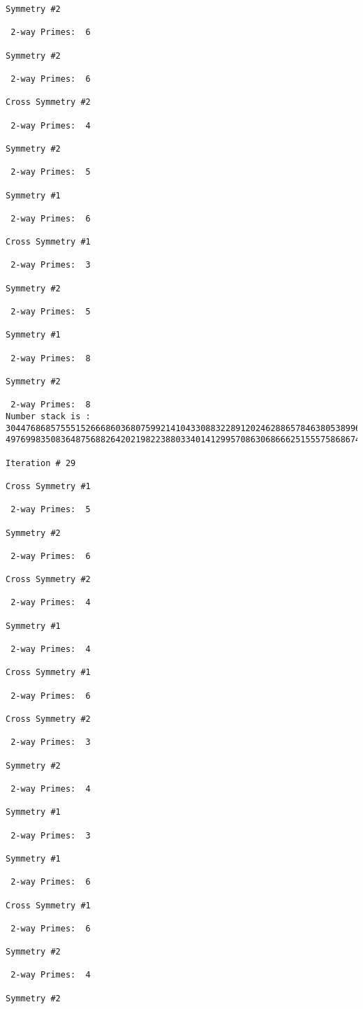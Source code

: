 {{{{\begin{verbatim}
Symmetry #2

 2-way Primes: 	6

Symmetry #2

 2-way Primes: 	6

Cross Symmetry #2

 2-way Primes: 	4

Symmetry #2

 2-way Primes: 	5

Symmetry #1

 2-way Primes: 	6

Cross Symmetry #1

 2-way Primes: 	3

Symmetry #2

 2-way Primes: 	5

Symmetry #1

 2-way Primes: 	8

Symmetry #2

 2-way Primes: 	8
Number stack is :
30447686857555152666860368075992141043308832289120246288657846380538996794608835958544046240163340857
49769983508364875688264202198223880334014129957086306866625155575868674403758043361042640445859538806

Iteration #	29

Cross Symmetry #1

 2-way Primes: 	5

Symmetry #2

 2-way Primes: 	6

Cross Symmetry #2

 2-way Primes: 	4

Symmetry #1

 2-way Primes: 	4

Cross Symmetry #1

 2-way Primes: 	6

Cross Symmetry #2

 2-way Primes: 	3

Symmetry #2

 2-way Primes: 	4

Symmetry #1

 2-way Primes: 	3

Symmetry #1

 2-way Primes: 	6

Cross Symmetry #1

 2-way Primes: 	6

Symmetry #2

 2-way Primes: 	4

Symmetry #2


\end{verbatim}}}}}
